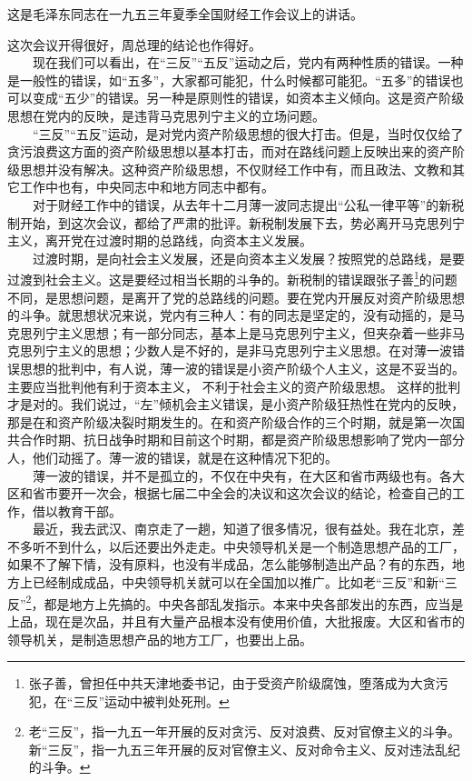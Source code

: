 \documentclass[cn,11pt,chinese]{elegantbook}
\begin{document}
\begin{introduction}\item  这是毛泽东同志在一九五三年夏季全国财经工作会议上的讲话。\end{introduction}
这次会议开得很好，周总理的结论也作得好。\\
　　现在我们可以看出，在“三反”“五反”运动之后，党内有两种性质的错误。一种是一般性的错误，如“五多”，大家都可能犯，什么时候都可能犯。“五多”的错误也可以变成“五少”的错误。另一种是原则性的错误，如资本主义倾向。这是资产阶级思想在党内的反映，是违背马克思列宁主义的立场问题。\\
　　“三反”“五反”运动，是对党内资产阶级思想的很大打击。但是，当时仅仅给了贪污浪费这方面的资产阶级思想以基本打击，而对在路线问题上反映出来的资产阶级思想并没有解决。这种资产阶级思想，不仅财经工作中有，而且政法、文教和其它工作中也有，中央同志中和地方同志中都有。\\
　　对于财经工作中的错误，从去年十二月薄一波同志提出“公私一律平等”的新税制开始，到这次会议，都给了严肃的批评。新税制发展下去，势必离开马克思列宁主义，离开党在过渡时期的总路线，向资本主义发展。\\
　　过渡时期，是向社会主义发展，还是向资本主义发展？按照党的总路线，是要过渡到社会主义。这是要经过相当长期的斗争的。新税制的错误跟张子善\footnote[1]{ 张子善，曾担任中共天津地委书记，由于受资产阶级腐蚀，堕落成为大贪污犯，在“三反”运动中被判处死刑。}的问题不同，是思想问题，是离开了党的总路线的问题。要在党内开展反对资产阶级思想的斗争。就思想状况来说，党内有三种人：有的同志是坚定的，没有动摇的，是马克思列宁主义思想；有一部分同志，基本上是马克思列宁主义，但夹杂着一些非马克思列宁主义的思想；少数人是不好的，是非马克思列宁主义思想。在对薄一波错误思想的批判中，有人说，薄一波的错误是小资产阶级个人主义，这是不妥当的。主要应当批判他有利于资本主义， 不利于社会主义的资产阶级思想。 这样的批判才是对的。我们说过，“左”倾机会主义错误，是小资产阶级狂热性在党内的反映，那是在和资产阶级决裂时期发生的。在和资产阶级合作的三个时期，就是第一次国共合作时期、抗日战争时期和目前这个时期，都是资产阶级思想影响了党内一部分人，他们动摇了。薄一波的错误，就是在这种情况下犯的。\\
　　薄一波的错误，并不是孤立的，不仅在中央有，在大区和省市两级也有。各大区和省市要开一次会，根据七届二中全会的决议和这次会议的结论，检查自己的工作，借以教育干部。\\
　　最近，我去武汉、南京走了一趟，知道了很多情况，很有益处。我在北京，差不多听不到什么，以后还要出外走走。中央领导机关是一个制造思想产品的工厂，如果不了解下情，没有原料，也没有半成品，怎么能够制造出产品？有的东西，地方上已经制成成品，中央领导机关就可以在全国加以推广。比如老“三反”和新“三反”\footnote[2]{ 老“三反”，指一九五一年开展的反对贪污、反对浪费、反对官僚主义的斗争。新“三反”，指一九五三年开展的反对官僚主义、反对命令主义、反对违法乱纪的斗争。}，都是地方上先搞的。中央各部乱发指示。本来中央各部发出的东西，应当是上品，现在是次品，并且有大量产品根本没有使用价值，大批报废。大区和省市的领导机关，是制造思想产品的地方工厂，也要出上品。\\
\end{document}
